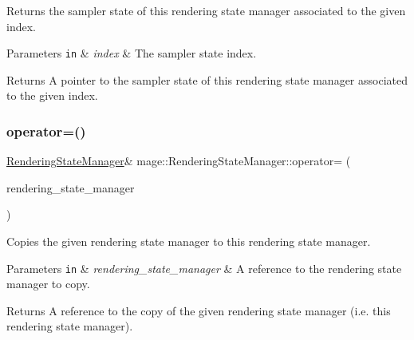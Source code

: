 Returns the sampler state of this rendering state manager associated to the given index.


\begin{DoxyParams}[1]{Parameters}
\mbox{\tt in}  & {\em index} & The sampler state index. \\
\hline
\end{DoxyParams}
\begin{DoxyReturn}{Returns}
A pointer to the sampler state of this rendering state manager associated to the given index. 
\end{DoxyReturn}
\hypertarget{classmage_1_1_rendering_state_manager_a4f2ee3e88ad79660e867a4a945ebe951}{}\label{classmage_1_1_rendering_state_manager_a4f2ee3e88ad79660e867a4a945ebe951} 
\subsubsection{\texorpdfstring{operator=()}{operator=()}\hspace{0.1cm}{\footnotesize\ttfamily [1/2]}}
{\footnotesize\ttfamily \hyperlink{classmage_1_1_rendering_state_manager}{Rendering\+State\+Manager}\& mage\+::\+Rendering\+State\+Manager\+::operator= (\begin{DoxyParamCaption}\item[{const \hyperlink{classmage_1_1_rendering_state_manager}{Rendering\+State\+Manager} \&}]{rendering\+\_\+state\+\_\+manager }\end{DoxyParamCaption})\hspace{0.3cm}{\ttfamily [delete]}}

Copies the given rendering state manager to this rendering state manager.


\begin{DoxyParams}[1]{Parameters}
\mbox{\tt in}  & {\em rendering\+\_\+state\+\_\+manager} & A reference to the rendering state manager to copy. \\
\hline
\end{DoxyParams}
\begin{DoxyReturn}{Returns}
A reference to the copy of the given rendering state manager (i.\+e. this rendering state manager). 
\end{DoxyReturn}
\hypertarget{classmage_1_1_rendering_state_manager_ac8ab6290fb1801ed1acc5b50c8749b6b}{}\label{classmage_1_1_rendering_state_manager_ac8ab6290fb1801ed1acc5b50c8749b6b} 
